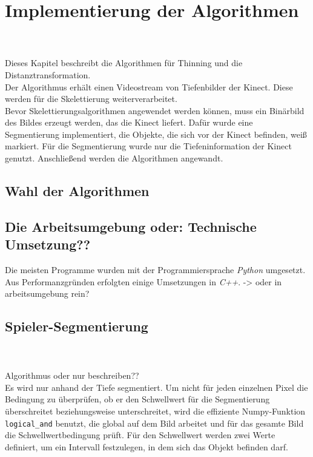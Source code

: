 \chapter{Implementierung der Algorithmen}
\\\\
Dieses Kapitel beschreibt die Algorithmen für Thinning und die Distanztransformation.\\
Der Algorithmus erhält einen Videostream von Tiefenbilder der Kinect. Diese werden für die
Skelettierung weiterverarbeitet. \\
Bevor Skelettierungsalgorithmen angewendet werden können, muss ein Binärbild des Bildes erzeugt werden, 
das die Kinect liefert. Dafür wurde eine Segmentierung implementiert, die Objekte, die sich vor der
Kinect befinden, weiß markiert. Für die Segmentierung wurde nur die Tiefeninformation der Kinect genutzt.
Anschließend werden die Algorithmen angewandt. 
\begin{algorithm}
\begin{algorithmic}[1]
\EndWhile
\EndProcedure
\end{algorithmic}
\end{algorithm}
\section{Wahl der Algorithmen}
\section{Die Arbeitsumgebung oder: Technische Umsetzung??}
Die meisten Programme wurden mit der Programmiersprache \emph{Python} umgesetzt. Aus Performanzgründen 
erfolgten einige Umsetzungen in \emph{C++}. -> oder in arbeitsumgebung rein?\\
\section{Spieler-Segmentierung}
\\\\
Algorithmus oder nur beschreiben??\\
Es wird nur anhand der Tiefe segmentiert. Um nicht für jeden einzelnen Pixel die Bedingung zu überprüfen, ob er den Schwellwert für die Segmentierung überschreitet beziehungsweise unterschreitet, wird die effiziente Numpy-Funktion \texttt{logical\_and} benutzt, die global auf dem Bild arbeitet und für das gesamte Bild die Schwellwertbedingung prüft. Für den Schwellwert werden zwei 
Werte definiert, um ein Intervall festzulegen, in dem sich das Objekt befinden darf. 
